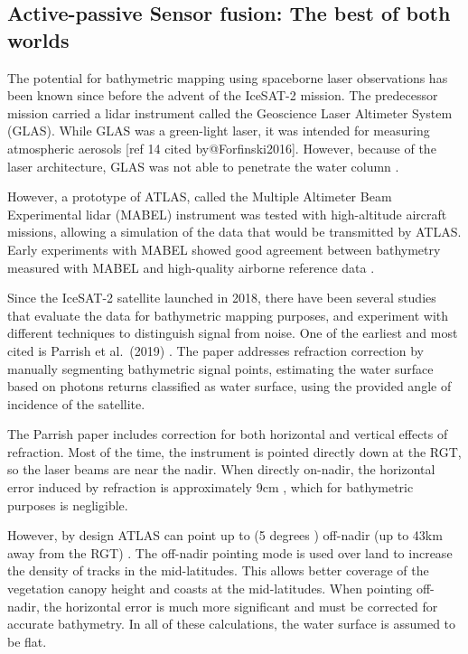 \hypertarget{active-passive-sensor-fusion-the-best-of-both-worlds}{%
  \subsection{Active-passive Sensor fusion: The best of both
    worlds}\label{active-passive-sensor-fusion-the-best-of-both-worlds}}

The potential for bathymetric mapping using spaceborne laser
observations has been known since before the advent of the IceSAT-2
mission. The predecessor mission carried a lidar instrument called the
Geoscience Laser Altimeter System (GLAS). While GLAS was a green-light
laser, it was intended for measuring atmospheric aerosols {[}ref 14
cited by@Forfinski2016{]}. However, because of the laser architecture,
GLAS was not able to penetrate the water column
\cite{Forfinski-Sarkozi2016}.

However, a prototype of ATLAS, called the Multiple Altimeter Beam
Experimental lidar (MABEL) instrument was tested with high-altitude
aircraft missions, allowing a simulation of the data that would be
transmitted by ATLAS. Early experiments with MABEL showed good agreement
between bathymetry measured with MABEL and high-quality airborne
reference data \cite{Jasinski2016,Forfinski-Sarkozi2016}.

Since the IceSAT-2 satellite launched in 2018, there have been several
studies that evaluate the data for bathymetric mapping purposes, and
experiment with different techniques to distinguish signal from noise.
One of the earliest and most cited is Parrish et al.~(2019)
\cite{Parrish2019}. The paper addresses refraction correction by
manually segmenting bathymetric signal points, estimating the water
surface based on photons returns classified as water surface, using the
provided angle of incidence of the satellite.

The Parrish paper includes correction for both horizontal and vertical
effects of refraction. Most of the time, the instrument is pointed
directly down at the RGT, so the laser beams are near the nadir. When
directly on-nadir, the horizontal error induced by refraction is
approximately 9cm \cite{Parrish2019}, which for bathymetric purposes
is negligible.

However, by design ATLAS can point up to (5 degrees ) off-nadir (up to
43km away from the RGT) \cite{Magruder2021}. The off-nadir pointing
mode is used over land to increase the density of tracks in the
mid-latitudes. This allows better coverage of the vegetation canopy
height and coasts at the mid-latitudes. When pointing off-nadir, the
horizontal error is much more significant and must be corrected for
accurate bathymetry. In all of these calculations, the water surface is
assumed to be flat.

